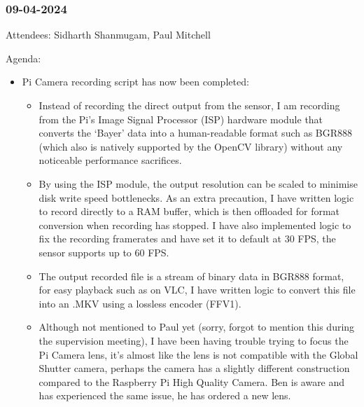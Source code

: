 \subsubsection{09-04-2024}
Attendees: Sidharth Shanmugam, Paul Mitchell

Agenda:

\begin{itemize}
    \item Pi Camera recording script has now been completed:
    \begin{itemize}
        \item Instead of recording the direct output from the sensor, I am recording from the Pi's Image Signal Processor (ISP) hardware module that converts the `Bayer' data into a human-readable format such as BGR888 (which also is natively supported by the OpenCV library) without any noticeable performance sacrifices.
        \item By using the ISP module, the output resolution can be scaled to minimise disk write speed bottlenecks. As an extra precaution, I have written logic to record directly to a RAM buffer, which is then offloaded for format conversion when recording has stopped. I have also implemented logic to fix the recording framerates and have set it to default at 30 FPS, the sensor supports up to 60 FPS.
        \item The output recorded file is a stream of binary data in BGR888 format, for easy playback such as on VLC, I have written logic to convert this file into an .MKV using a lossless encoder (FFV1).
        \item Although not mentioned to Paul yet (sorry, forgot to mention this during the supervision meeting), I have been having trouble trying to focus the Pi Camera lens, it's almost like the lens is not compatible with the Global Shutter camera, perhaps the camera has a slightly different construction compared to the Raspberry Pi High Quality Camera. Ben is aware and has experienced the same issue, he has ordered a new lens.
    \end{itemize}


\end{itemize}
